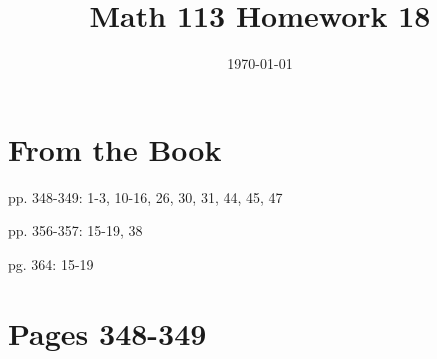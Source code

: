 \documentclass[fleqn,addpoints]{exam}
\title{Math 113 Homework 18}
\author{}
\date{\today}
\begin{document}
\maketitle

\section{From the Book}

\begin{itemize*}
  \item pp. 348-349: 1-3, 10-16, 26, 30, 31, 44, 45, 47
  \item pp. 356-357: 15-19, 38
  \item pg. 364: 15-19
\end{itemize*}


\ifprintanswers

\section{Pages 348-349}
\end{document}
